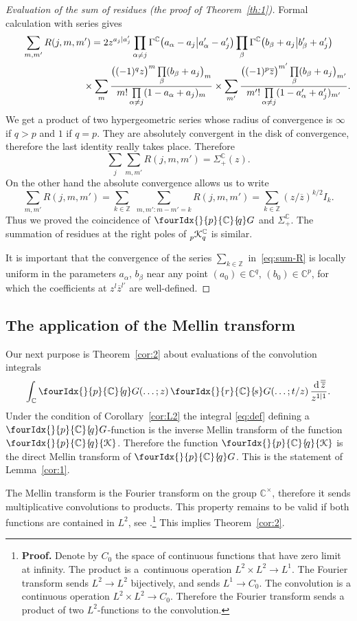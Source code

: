 \documentclass[pdftex]{sigma}
\numberwithin{equation}{section}
\newcommand{\Kc}[2]{\fourIdx{}{#1}{\C}{\!#2}{\EuScript K}}
\newcommand{\Gc}[2]{\fourIdx{}{#1}{\C}{\!#2}G}
\def\ov{\overline}
\def\C {{\mathbb C }}
\def\Z{{\mathbb Z}}
\def\cK{\EuScript K}
\newcommand{\dd}[1]{\,{\rm d}\,{\overline{\overline{#1}}} }
\begin{document}
\begin{proof}[Evaluation of the sum of residues (the proof of Theorem~\ref{th:1})]
Formal calculation with series gives
\begin{gather*}
\sum_{m,m'} R(j,m,m')=
2 z^{a_j|a_j'}
 \prod_{\alpha\ne j} \Gamma^\C\big(a_\alpha-a_j\big|a_\alpha'-a_j'\big)
 \prod_{\beta}
 \Gamma^\C\big(b_\beta+a_j\big|b_\beta'+a_j'\big)
\\
\hphantom{\sum_{m,m'} R(j,m,m')=}{} \times
 \sum_m \frac{ \big((-1)^{q} z\big)^m \prod\limits_{\beta}(b_\beta+a_j\big)_m} {m!\prod\limits_{\alpha\ne j} (1-a_\alpha+a_j)_m}
 \times
 \sum_{m'} \frac{ \big((-1)^{p} \ov z\big)^{m'} \prod\limits_{\beta}(b_\beta+a_j\big)_{m'}}
 {m'!\prod\limits_{\alpha\ne j} (1-a_\alpha'+a_j')_{m'}} .
 \end{gather*}
We get a product of two hypergeometric series whose radius of convergence
is $\infty$ if $q>p$ and $1$ if $q=p$.
They are absolutely convergent in the disk of convergence,
therefore the last identity really takes place.
Therefore
\[
\sum_j \sum_{m,m'} R(j,m,m')=\Sigma^\C_+ (z).
\]
On the other hand the absolute convergence allows us to write
 \begin{equation}
 \sum_{m,m'} R(j,m,m')=\sum_{k\in\Z}\,\,
\sum_{m,m'\colon m-m'=k} R(j,m,m')=\sum_{k\in\Z} (z/\ov z)^{k/2} I_k.
 \label{eq:sum-R}
 \end{equation}
Thus we proved the coincidence of $\Gc{p}{q}$ and $\Sigma_+^\C$.
The summation of residues at the right poles of
$_p^{\vphantom{\C}}\cK^\C_q$ is similar.

It is important that the convergence of the series $\sum\limits_{k\in\Z}$
in~\eqref{eq:sum-R} is locally uniform in the parameters
$a_\alpha$, $b_\beta$ near any point $(a_0)\in\C^q$, $(b_0)\in\C^p$,
for which the coefficients at $z^l\ov z^{l'}$ are well-defined.
\end{proof}

\subsection{The application of the Mellin transform}
Our next purpose is Theorem~\ref{cor:2} about evaluations
of the convolution integrals
\[
\int_{\C} \Gc{p}{q}(\dots;z)\, \Gc{r}{s}(\dots; t/z) \,\frac{\dd z}{z^{1|1}}.
\]
Under the condition of Corollary~\ref{cor:L2} the integral \eqref{eq:def}
defining a $\Gc{p}{q}$-function is the inverse Mellin transform
 of the function $\Kc{p}{q}$.
Therefore the function $\Kc{p}{q}$ is the direct Mellin transform
of $\Gc{p}{q}$.
This is the statement of Lemma~\ref{cor:1}.

The Mellin transform is the Fourier transform
on the group $\C^\times$, therefore it sends multiplicative convolutions
to products. This property remains to be valid if both functions are contained
 in $L^2$, see \cite[Theorem 64, Section~3.13]{Tit}.\footnote{{\bf Proof.} Denote by $C_0$ the space of continuous functions that have
 zero limit at infinity. The product is a~continuous operation $L^2\times L^2\to L^1$. The Fourier transform
 sends $L^2\to L^2$ bijectively, and sends $L^1\to C_0$.
 The convolution is a continuous operation $L^2\times L^2\to C_0$.
 Therefore the Fourier transform sends a product of two $L^2$-functions
 to the convolution.} This implies Theorem~\ref{cor:2}.
\end{document}
